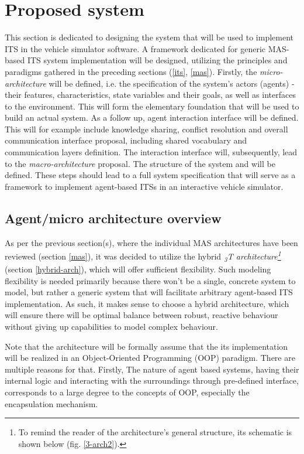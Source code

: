 \documentclass[main.tex]{subfiles}
\begin{document}
    
\section{Proposed system}\label{sec-system}

This section is dedicated to designing the system that will be used to implement ITS in the
vehicle simulator software. A framework dedicated for generic MAS-based ITS system
implementation will be designed, utilizing the principles and paradigms gathered in the
preceding sections (\ref{its}, \ref{mas}). Firstly, the \emph{micro-architecture} will be
defined, i.e. the specification of the system's actors (agents) - their features,
characteristics, state variables and their goals, as well as interfaces to the environment.
This will form the elementary foundation that will be used to build an actual system. As a
follow up, agent interaction interface will be defined. This will for example include
knowledge sharing, conflict resolution and overall communication interface proposal, including
shared vocabulary and communication layers definition. The interaction interface will,
subsequently, lead to the \emph{macro-architecture} proposal. The structure of the system and
will be defined. These steps should lead to a full system specification that will serve as a
framework to implement agent-based ITSs in an interactive vehicle simulator.

\subsection{Agent/micro architecture overview}

As per the previous section(s), where the individual MAS architectures have been reviewed
(section \ref{mas}), it was decided to utilize  the hybrid \emph{\textsubscript{3}T
architecture\footnote{To remind the reader of the architecture's general structure, its
schematic is shown below (fig. \ref{3-arch2}).}} (section \ref{hybrid-arch}), which will offer
sufficient flexibility.  Such modeling flexibility is needed primarily because there won't be a
single, concrete system to model, but rather a generic system that will facilitate arbitrary
agent-based ITS implementation. As such, it makes sense to choose a hybrid architecture, which
will ensure there will be optimal balance between robust, reactive behaviour without giving up
capabilities to model complex behaviour.

Note that the architecture will be formally assume that the its implementation will be realized 
in an Object-Oriented Programming (OOP) paradigm. There are multiple reasons for that. Firstly, 
The nature of agent based systems, having their internal logic and interacting with the surroundings 
through pre-defined interface, corresponds to a large degree to the concepts of OOP, especially
the encapsulation mechanism.
\end{document}
